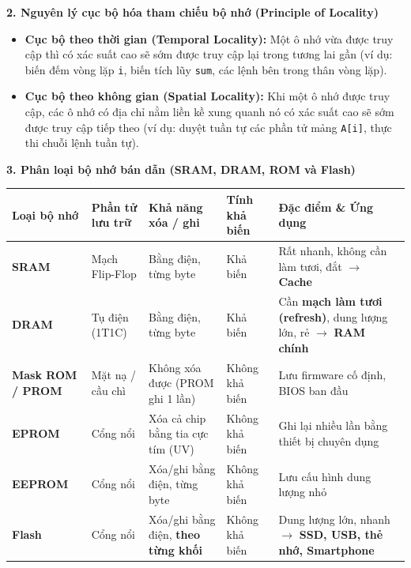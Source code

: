 \textbf{2. Nguyên lý cục bộ hóa tham chiếu bộ nhớ (Principle of Locality)}
\begin{itemize}
    \item \textbf{Cục bộ theo thời gian (Temporal Locality):} Một ô nhớ vừa được truy cập thì có xác suất cao sẽ sớm được truy cập lại trong tương lai gần (ví dụ: biến đếm vòng lặp \texttt{i}, biến tích lũy \texttt{sum}, các lệnh bên trong thân vòng lặp).
    \item \textbf{Cục bộ theo không gian (Spatial Locality):} Khi một ô nhớ được truy cập, các ô nhớ có địa chỉ nằm liền kề xung quanh nó có xác suất cao sẽ sớm được truy cập tiếp theo (ví dụ: duyệt tuần tự các phần tử mảng \texttt{A[i]}, thực thi chuỗi lệnh tuần tự).
\end{itemize}

\textbf{3. Phân loại bộ nhớ bán dẫn (SRAM, DRAM, ROM và Flash)}
\begin{tcolorbox}[bwbox, title={So sánh các loại bộ nhớ bán dẫn cơ bản}]
\begin{center}
\renewcommand{\arraystretch}{1.2}
\small
\begin{tabularx}{\linewidth}{|L{2.4cm}|L{2.5cm}|L{2.8cm}|L{2.2cm}|Y|}
\hline
\textbf{Loại bộ nhớ} & \textbf{Phần tử lưu trữ} & \textbf{Khả năng xóa / ghi} & \textbf{Tính khả biến} & \textbf{Đặc điểm \& Ứng dụng} \\ \hline
\textbf{SRAM} & Mạch Flip-Flop & Bằng điện, từng byte & Khả biến & Rất nhanh, không cần làm tươi, đắt $\rightarrow$ \textbf{Cache} \\ \hline
\textbf{DRAM} & Tụ điện (1T1C) & Bằng điện, từng byte & Khả biến & Cần \textbf{mạch làm tươi (refresh)}, dung lượng lớn, rẻ $\rightarrow$ \textbf{RAM chính} \\ \hline
\textbf{Mask ROM / PROM} & Mặt nạ / cầu chì & Không xóa được (PROM ghi 1 lần) & Không khả biến & Lưu firmware cố định, BIOS ban đầu \\ \hline
\textbf{EPROM} & Cổng nổi & Xóa cả chip bằng tia cực tím (UV) & Không khả biến & Ghi lại nhiều lần bằng thiết bị chuyên dụng \\ \hline
\textbf{EEPROM} & Cổng nổi & Xóa/ghi bằng điện, từng byte & Không khả biến & Lưu cấu hình dung lượng nhỏ \\ \hline
\textbf{Flash} & Cổng nổi & Xóa/ghi bằng điện, \textbf{theo từng khối} & Không khả biến & Dung lượng lớn, nhanh $\rightarrow$ \textbf{SSD, USB, thẻ nhớ, Smartphone} \\ \hline
\end{tabularx}
\end{center}
\end{tcolorbox}

